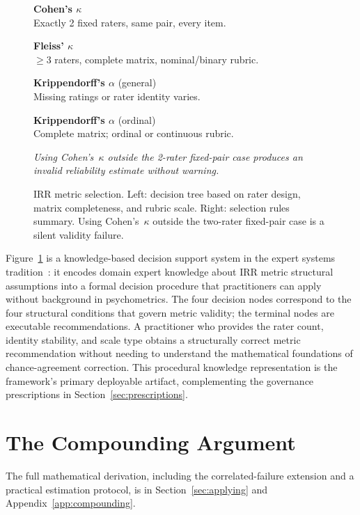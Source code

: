 \documentclass[preprint,12pt]{elsarticle}
\newcommand{\ck}{Cohen's~$\kappa$}
\begin{document}
\begin{figure}[t]
\begin{minipage}[t]{0.30\linewidth}
\noindent\textbf{Cohen's $\kappa$}\\
Exactly 2 fixed raters, same pair, every item.
\medskip

\noindent\textbf{Fleiss' $\kappa$}\\
$\geq$3 raters, complete matrix, nominal/binary rubric.
\medskip

\noindent\textbf{Krippendorff's $\alpha$} (general)\\
Missing ratings or rater identity varies.
\medskip

\noindent\textbf{Krippendorff's $\alpha$} (ordinal)\\
Complete matrix; ordinal or continuous rubric.
\medskip

{\tiny\itshape Using \ck{} outside the 2-rater
fixed-pair case produces an invalid reliability
estimate without warning.}
\end{minipage}
\caption{IRR metric selection. Left: decision tree based on rater design, matrix
completeness, and rubric scale. Right: selection rules summary. Using \ck{} outside
the two-rater fixed-pair case is a silent validity failure.}
\label{fig:decision-tree}
\end{figure}

Figure~\ref{fig:decision-tree} is a knowledge-based decision support system in the
expert systems tradition~\citep{james2026}: it encodes domain expert knowledge about
IRR metric structural assumptions into a formal decision procedure that practitioners
can apply without background in psychometrics. The four decision nodes correspond to
the four structural conditions that govern metric validity; the terminal nodes are
executable recommendations. A practitioner who provides the rater count, identity
stability, and scale type obtains a structurally correct metric recommendation without
needing to understand the mathematical foundations of chance-agreement correction.
This procedural knowledge representation is the framework's primary deployable
artifact, complementing the governance prescriptions in Section~\ref{sec:prescriptions}.

\section{The Compounding Argument}
\label{sec:compounding}

The full mathematical derivation, including the correlated-failure extension and a
practical estimation protocol, is in Section~\ref{sec:applying} and
Appendix~\ref{app:compounding}.
\end{document}
